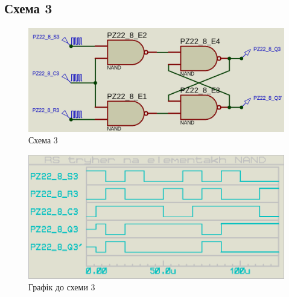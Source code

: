 \documentclass{article}
\begin{document}
\begin{normalsize}
	\section*{Схема 3}	
	\begin{figure}[H]
		\centering
		\includegraphics[scale=0.25]{s3}	
		\caption{Схема 3}
	\end{figure}
	
	\begin{figure}[H]
		\centering
		\includegraphics[scale=0.25]{g3}	
		\caption{Графік до схеми 3}
	\end{figure}


\end{normalsize}
\end{document}
